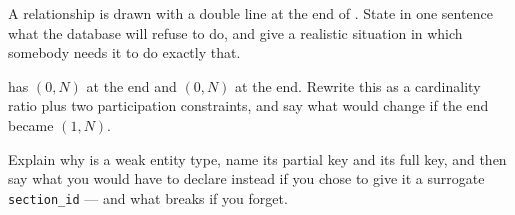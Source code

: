 \begin{checkpoint}
\begin{tightnum}
  \item A relationship is drawn with a double line at the  end
        of . State in one sentence what the database will
        refuse to do, and give a realistic situation in which somebody needs it
        to do exactly that.
  \item {} has $(0,N)$ at the  end and $(0,N)$
        at the  end. Rewrite this as a cardinality ratio plus
        two participation constraints, and say what would change if the
         end became $(1,N)$.
  \item Explain why  is a weak entity type, name its partial
        key and its full key, and then say what you would have to declare
        instead if you chose to give it a surrogate \texttt{section\_id} ---
        and what breaks if you forget.
\end{tightnum}
\end{checkpoint}

